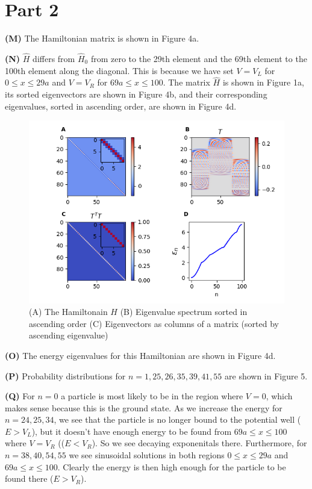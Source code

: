 \documentclass[12pt]{article}
\theoremstyle{definition}
\begin{document}
{\section{Part 2}

\vspace{0.1in}
\noindent \textbf{(M)} The Hamiltonian matrix is shown in Figure 4a.

\vspace{0.1in}
\noindent \textbf{(N)} $\hat{H}$ differs from $\hat{H}_{0}$ from zero to the 29th element and the 69th element to the 100th element along the diagonal. This is because we have set $V=V_{L}$ for $0 \leq x \leq 29a$ and $V=V_{R}$ for $69a\leq x \leq 100$. The matrix $\hat{H}$ is shown in Figure 1a, its sorted eigenvectors are shown in Figure 4b, and their corresponding eigenvalues, sorted in ascending order, are shown in Figure 4d. 

\begin{figure}[t!]
\centering
\includegraphics[width=15cm]{Figure_4}
\caption{(A) The Hamiltonain $H$ (B) Eigenvalue spectrum sorted in ascending order (C) Eigenvectors as columns of a matrix (sorted by ascending eigenvalue)}
\label{fig:method}
\end{figure}

\vspace{0.1in}
\noindent \textbf{(O)} The energy eigenvalues for this Hamiltonian are shown in Figure 4d.

\vspace{0.1in}
\noindent \textbf{(P)} Probability distributions for $n=1, 25, 26, 35, 39, 41, 55$ are shown in Figure 5.

\vspace{0.1in}
\noindent \textbf{(Q)} For $n=0$ a particle is most likely to be in the region where $V=0$, which makes sense because this is the ground state. As we increase the energy for $n=24,25,34$, we see that the particle is no longer bound to the potential well ($E > V_{L}$), but it doesn't have enough energy to be found from $69a\leq x \leq 100$ where $V=V_{R}$ (($E < V_{R}$). So we see decaying exponenitals there. Furthermore, for $n=38,40,54,55$ we see sinusoidal solutions in both regions $0 \leq x \leq 29a$ and $69a\leq x \leq 100$. Clearly the energy is then high enough for the particle to be found there ($E > V_{R}$).

}
\end{document}
